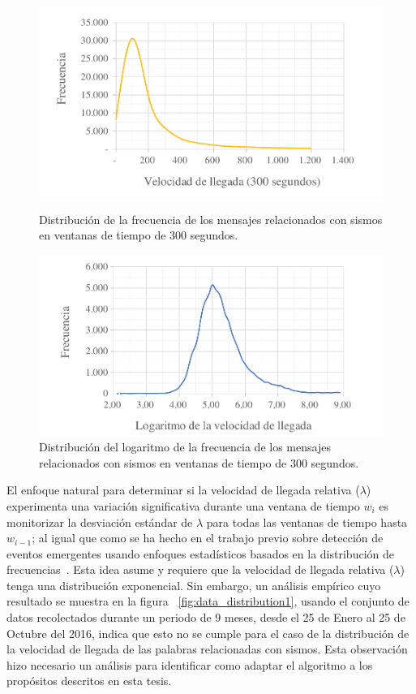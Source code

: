 \begin{figure}[h]
 \includegraphics[trim={20 6 0 6}, clip, width=\linewidth]{imagenes/distribucion_02.pdf}
 \caption{Distribución de la frecuencia de los mensajes relacionados con sismos en ventanas de tiempo de 300 segundos.}
 \label{fig:data_distribution1}
\endminipage\hfill
{}
  \includegraphics[trim={20 0 0 0}, clip, width=\linewidth]{imagenes/distribucion_03.pdf}
  \caption{Distribución del logaritmo de la frecuencia de los mensajes relacionados con sismos en ventanas de tiempo de 300 segundos.}
  \label{fig:data_distribution2}
\endminipage\hfill
\end{figure}


El enfoque natural para determinar si la velocidad de llegada relativa ($\lambda$) experimenta una variación significativa durante una ventana de tiempo $w_i$ es monitorizar la desviación estándar de $\lambda$ para todas las ventanas de tiempo hasta $w_{i-1}$; al igual que como se ha hecho en el trabajo previo sobre detección de eventos emergentes usando enfoques estadísticos basados en la distribución de frecuencias~\cite{kleinberg2003bursty, mathioudakis2010twittermonitor,
nguyen2013event}.
%
Esta idea asume y requiere que la velocidad de llegada relativa ($\lambda$) tenga una distribución exponencial. 
%
Sin embargo, un análisis empírico cuyo resultado se muestra en la figura ~\ref{fig:data_distribution1}, usando el conjunto de datos recolectados durante un periodo de 9 meses, desde el 25 de Enero al 25 de Octubre del 2016, indica que esto no se cumple para el caso de la distribución de la velocidad de llegada de las palabras relacionadas con sismos.
%
Esta observación hizo necesario un análisis para identificar como adaptar el algoritmo a los propósitos descritos en esta tesis.


